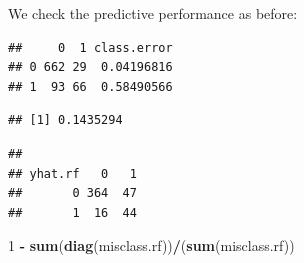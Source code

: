 \documentclass[10pt,ignorenonframetext,]{beamer}
\newenvironment{Shaded}{\begin{snugshade}}{\end{snugshade}}
\newcommand{\KeywordTok}[1]{\textcolor[rgb]{0.13,0.29,0.53}{\textbf{#1}}}
\newcommand{\DataTypeTok}[1]{\textcolor[rgb]{0.13,0.29,0.53}{#1}}
\newcommand{\DecValTok}[1]{\textcolor[rgb]{0.00,0.00,0.81}{#1}}
\newcommand{\StringTok}[1]{\textcolor[rgb]{0.31,0.60,0.02}{#1}}
\newcommand{\OperatorTok}[1]{\textcolor[rgb]{0.81,0.36,0.00}{\textbf{#1}}}
\newcommand{\NormalTok}[1]{#1}
\begin{document}
\begin{frame}[fragile]

We check the predictive performance as before: \footnotesize

\begin{Shaded}
\end{Shaded}

\begin{verbatim}
##     0  1 class.error
## 0 662 29  0.04196816
## 1  93 66  0.58490566
\end{verbatim}

\begin{Shaded}
\end{Shaded}

\begin{verbatim}
## [1] 0.1435294
\end{verbatim}

\begin{Shaded}
\end{Shaded}

\begin{verbatim}
##        
## yhat.rf   0   1
##       0 364  47
##       1  16  44
\end{verbatim}

\begin{Shaded}
\begin{Highlighting}[]
\DecValTok{1} \OperatorTok{-}\StringTok{ }\KeywordTok{sum}\NormalTok{(}\KeywordTok{diag}\NormalTok{(misclass.rf))}\OperatorTok{/}\NormalTok{(}\KeywordTok{sum}\NormalTok{(misclass.rf))}
\end{Highlighting}
\end{Shaded}


\end{frame}
\end{document}
